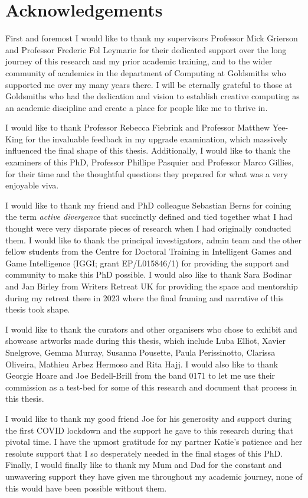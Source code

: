 \chapter*{Acknowledgements}

First and foremost I would like to thank my supervisors Professor Mick Grierson and Professor Frederic Fol Leymarie for their dedicated support over the long journey of this research and my prior academic training, and to the wider community of academics in the department of Computing at Goldsmiths who supported me over my many years there. I will be eternally grateful to those at Goldsmiths who had the dedication and vision to establish creative computing as an academic discipline and create a place for people like me to thrive in. 

I would like to thank Professor Rebecca Fiebrink and Professor Matthew Yee-King for the invaluable feedback in my upgrade examination, which massively influenced the final shape of this thesis. Additionally, I would like to thank the examiners of this PhD, Professor Phillipe Pasquier and Professor Marco Gillies, for their time and the thoughtful questions they prepared for what was a very enjoyable viva. 

I would like to thank my friend and PhD colleague Sebastian Berns for coining the term \textit{active divergence} that succinctly defined and tied together what I had thought were very disparate pieces of research when I had originally conducted them. I would like to thank the principal investigators, admin team and the other fellow students from the Centre for Doctoral Training in Intelligent Games and Game Intelligence (IGGI; grant EP/L015846/1) for providing the support and community to make this PhD possible. I would also like to thank Sara Bodinar and Jan Birley from Writers Retreat UK for providing the space and mentorship during my retreat there in 2023 where the final framing and narrative of this thesis took shape. 

I would like to thank the curators and other organisers who chose to exhibit and showcase artworks made during this thesis, which include Luba Elliot, Xavier Snelgrove, Gemma Murray, Susanna Pousette, Paula Perissinotto, Clarissa Oliveira, Mathieu Arbez Hermoso and Rita Hajj. I would also like to thank Georgie Hoare and Joe Bedell-Brill from the band 0171 to let me use their commission as a test-bed for some of this research and document that process in this thesis.

I would like to thank my good friend Joe for his generosity and support during the first COVID lockdown and the support he gave to this research during that pivotal time. I have the upmost gratitude for my partner Katie's patience and her resolute support that I so desperately needed in the final stages of this PhD. Finally, I would finally like to thank my Mum and Dad for the constant and unwavering support they have given me throughout my academic journey, none of this would have been possible without them. 

